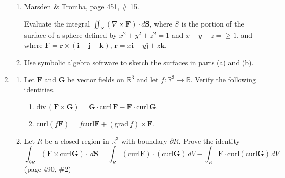 \documentclass{article}
\newcommand{\divt}{\text{div} \,}
\begin{document}
\begin{enumerate}
\begin{enumerate}
        \item Marsden \& Tromba, page 451, \# 15.

            Evaluate the integral $\displaystyle \iint_S (\nabla \times 
            \boldsymbol F) \cdot d \boldsymbol S$, where $S$ is the portion
            of the surface of a sphere defined by $x^2 + y^2 + z^2 = 1$ and
            $x + y + z = \geq 1$, and where $\boldsymbol F = \boldsymbol r
            \times ( \boldsymbol i + \boldsymbol j + \boldsymbol k),\, 
            \boldsymbol r = x \boldsymbol i + y \boldsymbol j + z \boldsymbol
            k.$
        \item Use symbolic algebra software to sketch the surfaces in parts (a) and (b).
    \end{enumerate}
    
    \newpage
    \item 
    \begin{enumerate}
        \item Let $\boldsymbol F$ and $\boldsymbol G$ be vector fields on 
        $\mathbb{R}^3$ and let $f : \mathbb{R}^3 \rightarrow \mathbb{R}$.
        Verify the following identities.
        \begin{enumerate}[label=(\roman*)]
            \item $\divt (\boldsymbol F \times \boldsymbol G) 
            = \boldsymbol G \cdot \text{curl} \, \boldsymbol F 
            - \boldsymbol F \cdot \text{curl} \, \boldsymbol G.$
            \item curl$(f \boldsymbol F) 
            = f \text{curl} \boldsymbol F 
            + (\text{grad}\, f) \times \boldsymbol F$.
        \end{enumerate}
        \item Let $R$ be a closed region in $\mathbb{R}^3$ with boundary 
        $\partial R$. Prove the identity
        \[\int_{\partial R} ( \boldsymbol F \times \text{curl} \boldsymbol G) 
        \cdot \, d \boldsymbol S = 
        \int_R(\text{curl} \boldsymbol F ) 
        \cdot (\text{curl} \boldsymbol G) \, dV 
        - \int_R \boldsymbol F 
        \cdot \text{curl}(\text{curl} \boldsymbol G ) \, dV\]
        (page 490, \#2)
    \end{enumerate}
\end{enumerate}
\end{document}
